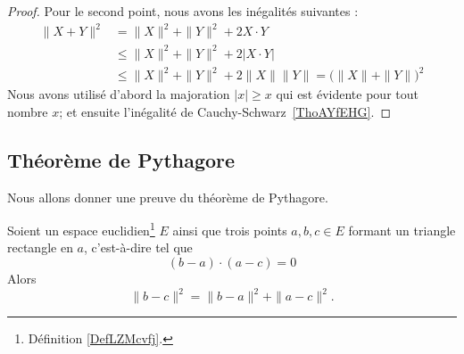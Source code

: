 \begin{proof}
	Pour le second point, nous avons les inégalités suivantes :
	\begin{subequations}
		\begin{align}
			\| X+Y \|^2 & =\| X \|^2+\| Y \|^2+2X\cdot Y                                         \\
			            & \leq\| X \|^2+\| Y \|^2+2|X\cdot Y|                                    \\
			            & \leq\| X \|^2+\| Y \|^2+2\| X \|\| Y \| =\big( \| X \|+\| Y \| \big)^2
		\end{align}
	\end{subequations}
	Nous avons utilisé d'abord la majoration \( | x |\geq x\) qui est évidente pour tout nombre \( x\); et ensuite l'inégalité de Cauchy-Schwarz~\ref{ThoAYfEHG}.
\end{proof}

\subsection{Théorème de Pythagore}

Nous allons donner une preuve du théorème de Pythagore.

\begin{theorem}     \label{THOooHXHWooCpcDan}
	Soient un espace euclidien\footnote{Définition \ref{DefLZMcvfj}.} \( E\) ainsi que trois points \( a,b,c\in E\) formant un triangle rectangle en \( a\), c'est-à-dire tel que
	\begin{equation}        \label{EQooRAWAooBxlBcZ}
		(b-a)\cdot (a-c)=0
	\end{equation}
	Alors
	\begin{equation}
		\| b-c \|^2=\| b-a \|^2+\| a-c \|^2.
	\end{equation}
\end{theorem}

